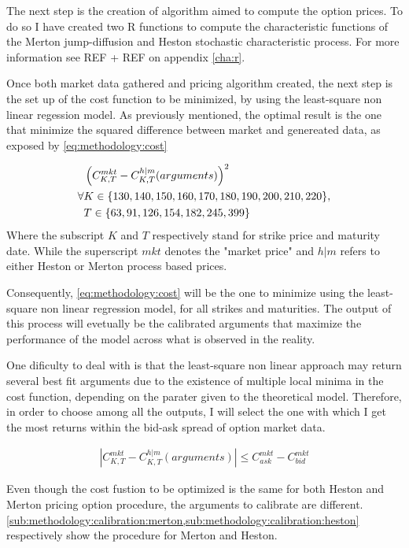 \documentclass[12pt]{report}
\begin{document}
The next step is the creation of algorithm aimed to compute the option prices. To do so I have created two R functions to compute the characteristic functions of the Merton jump-diffusion and Heston stochastic characteristic process. For more information see REF + REF on appendix \cref{cha:r}.

Once both market data gathered and pricing algorithm created, the next step is the set up of the cost function to be minimized, by using the least-square non linear regession model.
As previously mentioned, the optimal result is the one that minimize the squared difference between market and genereated data, as exposed by \cref{eq:methodology:cost}

\begin{align}
 &\left(C_{K,T}^{mkt} - C_{K,T}^{h|m}(arguments)\right)^2
 \label{eq:methodology:cost}\\
 \forall &K \in \{130, 140, 150, 160, 170, 180, 190, 200, 210, 220\}, \notag\\
 &T \in \left \{63, 91, 126, 154, 182, 245, 399\right \}\notag 
\end{align}
Where the subscript $K$ and $T$ respectively stand for strike price and maturity date. While the superscript $mkt$ denotes the "market price" and $h|m$ refers to either Heston or Merton process based prices.

Consequently, \cref{eq:methodology:cost} will be the one to minimize using the least-square non linear regression model, for all strikes and maturities.
The output of this process will evetually be the calibrated arguments that maximize the performance of the model across what is observed in the reality.

One dificulty to deal with is that the least-square non linear approach may return several best fit arguments due to the existence of multiple local minima in the cost function, depending on the parater given to the theoretical model.
Therefore, in order to choose among all the outputs, I will select the one with which I get the most returns within the bid-ask spread of option market data.

\begin{align}
 \left | C_{K,T}^{mkt} - C_{K,T}^{h|m}(arguments) \right | \leq C_{ask}^{mkt} - C_{bid}^{mkt}
 \label{eq:methodology:cost}
\end{align}

Even though the cost fustion to be optimized is the same for both Heston and Merton pricing option procedure, the arguments to calibrate are different. \cref{sub:methodology:calibration:merton,sub:methodology:calibration:heston} respectively show the procedure for Merton and Heston.
\end{document}
